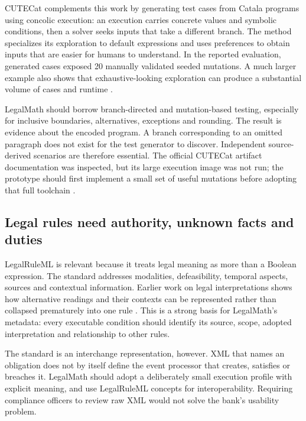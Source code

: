 CUTECat complements this work by generating test cases from Catala programs using
concolic execution: an execution carries concrete values and symbolic conditions,
then a solver seeks inputs that take a different branch. The method specializes
its exploration to default expressions and uses preferences to obtain inputs
that are easier for humans to understand. In the reported evaluation, generated
cases exposed 20 manually validated seeded mutations. A much larger example also
shows that exhaustive-looking exploration can produce a substantial volume of
cases and runtime \citep[secs.~3--5]{cutecat2025}.

LegalMath should borrow branch-directed and mutation-based testing, especially
for inclusive boundaries, alternatives, exceptions and rounding. The result is
evidence about the encoded program. A branch corresponding to an omitted
paragraph does not exist for the test generator to discover. Independent
source-derived scenarios are therefore essential. The official CUTECat artifact
documentation was inspected, but its large execution image was not run; the
prototype should first implement a small set of useful mutations before adopting
that full toolchain \citep{libraryreview}.

\subsection{Legal rules need authority, unknown facts and duties}

LegalRuleML is relevant because it treats legal meaning as more than a Boolean
expression. The standard addresses modalities, defeasibility, temporal aspects,
sources and contextual information. Earlier work on legal interpretations shows
how alternative readings and their contexts can be represented rather than
collapsed prematurely into one rule
\citep[sec.~4]{legalinterpretations2014,legalruleml2021}. This is a strong basis
for LegalMath's metadata: every executable condition should identify its source,
scope, adopted interpretation and relationship to other rules.

The standard is an interchange representation, however. XML that names an
obligation does not by itself define the event processor that creates, satisfies
or breaches it. LegalMath should adopt a deliberately small execution profile
with explicit meaning, and use LegalRuleML concepts for interoperability. Requiring
compliance officers to review raw XML would not solve the bank's usability problem.

